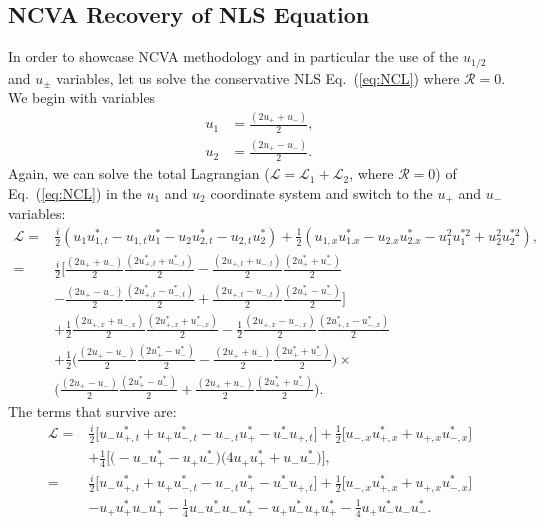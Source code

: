 \subsection{NCVA Recovery of NLS Equation}
In order to showcase NCVA methodology and in particular the use of the $u_{1/2}$ and $u_{\pm}$ variables, let us solve the conservative NLS Eq.~(\ref{eq:NCL}) where $\mathcal{R} = 0$.  We begin with variables 
\begin{align}
u_1 &= \frac{(2u_+ + u_-)}{2}, \\ 
u_2 &= \frac{(2u_+ - u_-)}{2}.
 \end{align}
Again, we can solve the total Lagrangian ($\mathcal{L} = \mathcal{L}_1 +\mathcal{L}_2$, where $\mathcal{R} = 0$) of Eq.~(\ref{eq:NCL}) in the $u_1$ and $u_2$ coordinate system and switch to the $u_+$ and $u_-$ variables:
\begin{align}
\mathcal{L} =& \frac{i}{2}(u_1u_{1,t}^* - u_{1,t}u_1^* - u_2u_{2,t}^* - u_{2,t}u_2^* ) + \frac{1}{2}(u_{1,x}u_{1.x}^* - u_{2.x}u_{2.x}^* -  u_1^2 u_1^{*2} + u_2^2 u_2^{*2} ), \nonumber  \\
=& \frac{i}{2}\Bigg[\frac{( 2u_+ + u_-)}{2}\frac{(2u_{+,t}^* + u_{-,t}^*)}{2} -\frac{(2u_{+,t} + u_{-,t})}{2} \frac{(2u_+^* + u_-^*)}{2} \nonumber \\
&- \frac{(2u_+ - u_-)}{2}\frac{(2u_{+,t}^* - u_{-,t}^*)}{2}  + \frac{(2u_{+,t} - u_{-,t})}{2} \frac{(2u_+^* -u_-^*)}{2}\Bigg] \nonumber \\  
&+ \frac{1}{2} \frac{(2u_{+,x} + u_{-,x})}{2}\frac{(2u_{+,x}^* + u_{-,x}^*)}{2} -   \frac{1}{2} \frac{(2u_{+,x} - u_{-,x})}{2}\frac{(2u_{+,x}^* - u_{-,x}^*)}{2} \nonumber \\
&+\frac{1}{2} \Bigg( \frac{(2u_+ - u_-)}{2} \frac{(2u_+^* - u_-^*)}{2} - \frac{(2u_+ + u_-)}{2} \frac{(2u_+^* + u_-^*)}{2}    \Bigg) \times \nonumber \\
& \Bigg( \frac{(2u_+ - u_-)}{2} \frac{(2u_+^* - u_-^*)}{2} + \frac{(2u_+ + u_-)}{2} \frac{(2u_+^* + u_-^*)}{2}    \Bigg). 
\end{align}
The terms that survive are:
\begin{align}
\mathcal{L}  = &\frac{i}{2} \Bigg[u_-u_{+,t}^* + u_+u_{-,t}^* - u_{-,t}u_+^* - u_-^* u_{+,t} \Bigg] +  \frac{1}{2}   \Bigg[  u_{-,x}u_{+,x}^* + u_{+,x}u_{-,x}^*\Bigg] \nonumber \\
&+ \frac{1}{4}  \Bigg[ \Big( -u_-u_+^* - u_+u_-^*\Big)\Big( 4u_+u_+^* + u_- u_-^* \Big) \Bigg] , \nonumber \\
= & \frac{i}{2} \Bigg[u_-u_{+,t}^* + u_+u_{-,t}^* - u_{-,t}u_+^* - u_-^* u_{+,t} \Bigg] +  \frac{1}{2}   \Bigg[  u_{-,x}u_{+,x}^* + u_{+,x}u_{-,x}^*\Bigg] \nonumber \\
&- u_+u_+^*u_-u_+^* -\frac{1}{4} u_- u_-^*u_-u_+^* - u_+u_-^*u_+u_+^* -\frac{1}{4} u_+u_-^*u_- u_-^*.  \label{eq:l}
\end{align}
